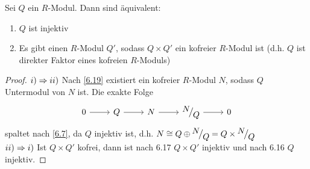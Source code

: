 \begin{fo}\label{6.20}
	Sei $Q$ ein $R$-Modul. Dann sind äquivalent:
	\begin{enumerate}[label= \roman*)]
		\item $Q$ ist injektiv
		\item Es gibt einen $R$-Modul $Q'$, sodass $Q \times Q'$ ein kofreier $R$-Modul ist (d.h. $Q$ ist direkter Faktor eines kofreien $R$-Moduls)
	\end{enumerate}
\end{fo}
\begin{proof}
	$i) \Rightarrow ii)$ Nach \ref{6.19} existiert ein kofreier $R$-Modul $N$, sodass $Q$ Untermodul von $N$ ist. Die exakte Folge 
	$$\begin{tikzcd}
	0 \arrow{r} & Q \arrow{r} & N \arrow{r} & \QR{N}{Q} \arrow{r} & 0
	\end{tikzcd}$$
	spaltet nach \ref{6.7}, da $Q$ injektiv ist, d.h. $N \cong Q \oplus \QR{N}{Q}  = Q \times \QR{N}{Q}$\\
	$ii) \Rightarrow i)$ Ist $Q\times Q'$ kofrei, dann ist nach 6.17 $Q \times Q'$ injektiv und nach 6.16 $Q$ injektiv.
\end{proof}
\newpage
